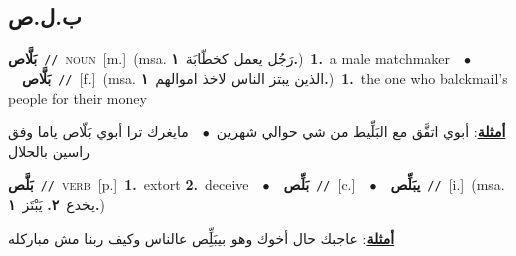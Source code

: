 \documentclass[10pt,a4paper,twoside]{article} %
\begin{document}
\begin{multicols}{2}
\vspace{-3mm}
\subsection*{\color{blue}\foreignlanguage{arabic}{ب.ل.ص}\color{blue}{}} 

{\setlength\topsep{0pt}\textbf{\foreignlanguage{arabic}{بَلَّاص}}\ {\color{gray}\texttt{//}\color{black}}\ \textsc{noun}\ [m.]\ \color{gray}(msa. \foreignlanguage{arabic}{رَجُل يعمل كخطّابَة}~\foreignlanguage{arabic}{\textbf{١.}})\color{black}\ \textbf{1.}~a male matchmaker\ \ $\bullet$\ \ \setlength\topsep{0pt}\textbf{\foreignlanguage{arabic}{بَلَّاص}}\ {\color{gray}\texttt{//}\color{black}}\ [f.]\ \color{gray}(msa. \foreignlanguage{arabic}{الذين يبتز الناس لاخذ اموالهم}~\foreignlanguage{arabic}{\textbf{١.}})\color{black}\ \textbf{1.}~the one who balckmail's people for their money\  \begin{flushright}\color{gray}\foreignlanguage{arabic}{\textbf{\underline{\foreignlanguage{arabic}{أمثلة}}}: أبوي اتفَّق مع البَلِّيط من شي حوالي شهرين\ $\bullet$\ \  مايغرك ترا أبوي بَلّاص ياما وفق راسين بالحلال}\end{flushright}\color{black}} \vspace{2mm}

{\setlength\topsep{0pt}\textbf{\foreignlanguage{arabic}{بَلَّص}}\ {\color{gray}\texttt{//}\color{black}}\ \textsc{verb}\ [p.]\ \textbf{1.}~extort  \textbf{2.}~deceive\ \ $\bullet$\ \ \setlength\topsep{0pt}\textbf{\foreignlanguage{arabic}{بَلِّص}}\ {\color{gray}\texttt{//}\color{black}}\ [c.]\ \ $\bullet$\ \ \setlength\topsep{0pt}\textbf{\foreignlanguage{arabic}{يبَلِّص}}\ {\color{gray}\texttt{//}\color{black}}\ [i.]\ \color{gray}(msa. \foreignlanguage{arabic}{يخدع}~\foreignlanguage{arabic}{\textbf{٢.}}  \foreignlanguage{arabic}{يَبْتَز}~\foreignlanguage{arabic}{\textbf{١.}})\color{black}\  \begin{flushright}\color{gray}\foreignlanguage{arabic}{\textbf{\underline{\foreignlanguage{arabic}{أمثلة}}}: عاجبك حال أخوك وهو بيبَلِِّص عالناس وكيف ربنا مش مباركله}\end{flushright}\color{black}} \vspace{2mm}


\end{multicols}
\end{document}
